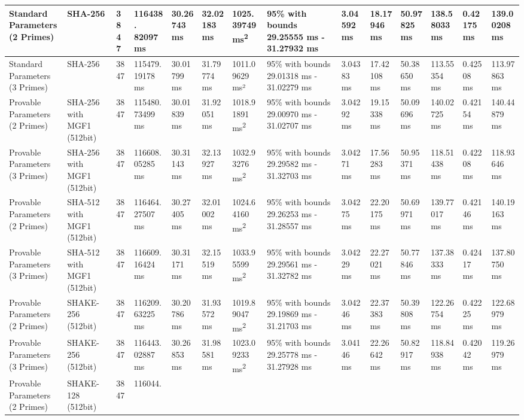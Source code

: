 \documentclass[]{final_report}
\theoremstyle{definition}
\begin{document}
\begin{landscape}
\begin{longtable}{|p{2.3cm}|p{1.8cm}|p{1.0cm}|p{1.7cm}|p{1.4cm}|p{1.5cm}|p{1.8cm}|p{1.5cm}|p{1.2cm}|p{1.5cm}|p{1.3cm}|p{1.4cm}|p{1.3cm}|p{1.5cm}|}
Standard Parameters (2 Primes) & SHA-256 & 3847 & 116438.
82097 ms & 30.26743 ms & 32.02183 ms & 1025.39749 ms\textsuperscript{2} & 95\% with bounds 29.25555 ms - 31.27932 ms & 3.04592 ms & 18.17946 ms & 50.97825 ms & 138.58033 ms & 0.42175 ms & 139.00208 ms \\
\hline
Standard Parameters (3 Primes) & SHA-256 & 3847 & 115479.
19178 ms & 30.01799 ms & 31.79774 ms & 1011.09629 ms² & 95\% with bounds 29.01318 ms - 31.02279 ms & 3.04383 ms & 17.42108 ms & 50.38650 ms & 113.55354 ms & 0.42508 ms & 113.97863 ms \\
\hline
Provable Parameters (2 Primes) & SHA-256 with MGF1 (512bit) & 3847 & 115480.
73499 ms & 30.01839 ms & 31.92051 ms & 1018.91891 ms\textsuperscript{2} & 95\% with bounds 29.00970 ms - 31.02707 ms & 3.04292 ms & 19.15338 ms & 50.09696 ms & 140.02725 ms & 0.42154 ms & 140.44879 ms \\
\hline
Provable Parameters (3 Primes) & SHA-256 with MGF1 (512bit) & 3847 & 116608.
05285 ms & 30.31143 ms & 32.13927 ms & 1032.93276 ms\textsuperscript{2} & 95\% with bounds 29.29582 ms - 31.32703 ms & 3.04271 ms & 17.56283 ms & 50.95371 ms & 118.51438 ms & 0.42208 ms & 118.93646 ms \\
\hline
Provable Parameters (2 Primes) & SHA-512 with MGF1 (512bit) & 3847 & 116464.
27507 ms & 30.27405 ms & 32.01002 ms & 1024.64160 ms\textsuperscript{2} & 95\% with bounds 29.26253 ms - 31.28557 ms & 3.04275 ms & 22.20175 ms & 50.69971 ms & 139.77017 ms & 0.42146 ms & 140.19163 ms \\
\hline
Provable Parameters (3 Primes) & SHA-512 with MGF1 (512bit) & 3847 & 116609.
16424 ms & 30.31171 ms & 32.15519 ms & 1033.95599 ms\textsuperscript{2} & 95\% with bounds 29.29561 ms - 31.32782 ms & 3.04229 ms & 22.27021 ms & 50.77846 ms & 137.38333 ms & 0.42417 ms & 137.80750 ms \\
\hline
Provable Parameters (2 Primes) & SHAKE-256 (512bit) & 3847 & 116209.
63225 ms & 30.20786 ms & 31.93572 ms & 1019.89047 ms\textsuperscript{2} & 95\% with bounds 29.19869 ms - 31.21703 ms & 3.04246 ms & 22.37383 ms & 50.39808 ms & 122.26754 ms & 0.42225 ms & 122.68979 ms \\
\hline
Provable Parameters (3 Primes) & SHAKE-256 (512bit) & 3847 & 116443.
02887 ms & 30.26853 ms & 31.98581 ms & 1023.09233 ms\textsuperscript{2} & 95\% with bounds 29.25778 ms - 31.27928 ms & 3.04146 ms & 22.26642 ms & 50.82917 ms & 118.84938 ms & 0.42042 ms & 119.26979 ms \\
\hline
Provable Parameters (2 Primes) & SHAKE-128 (512bit) & 3847 & 116044.

\end{longtable}
\end{landscape}
\end{document}
